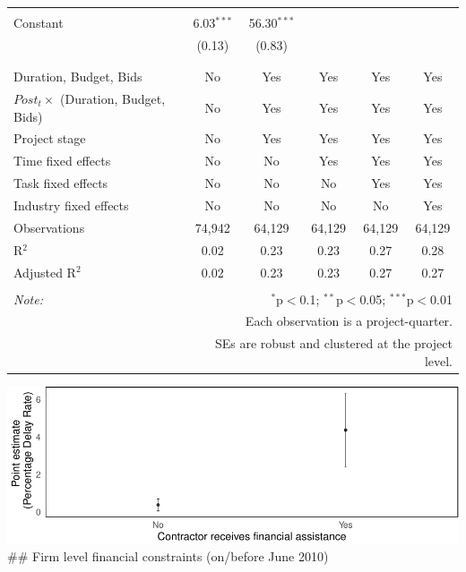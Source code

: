 \documentclass[
]{article}
\begin{document}
\begin{table}[H]
\begin{tabular}{@{\extracolsep{-2pt}}lccccc}
  & & & & & \\ 
 Constant & 6.03$^{***}$ & 56.30$^{***}$ &  &  &  \\ 
  & (0.13) & (0.83) &  &  &  \\ 
  & & & & & \\ 
\hline \\[-1.8ex] 
Duration, Budget, Bids & No & Yes & Yes & Yes & Yes \\ 
$Post_t \times $  (Duration, Budget, Bids) & No & Yes & Yes & Yes & Yes \\ 
Project stage & No & Yes & Yes & Yes & Yes \\ 
Time fixed effects & No & No & Yes & Yes & Yes \\ 
Task fixed effects & No & No & No & Yes & Yes \\ 
Industry fixed effects & No & No & No & No & Yes \\ 
Observations & 74,942 & 64,129 & 64,129 & 64,129 & 64,129 \\ 
R$^{2}$ & 0.02 & 0.23 & 0.23 & 0.27 & 0.28 \\ 
Adjusted R$^{2}$ & 0.02 & 0.23 & 0.23 & 0.27 & 0.27 \\ 
\hline 
\hline \\[-1.8ex] 
\textit{Note:}  & \multicolumn{5}{r}{$^{*}$p$<$0.1; $^{**}$p$<$0.05; $^{***}$p$<$0.01} \\ 
 & \multicolumn{5}{r}{Each observation is a project-quarter.} \\ 
 & \multicolumn{5}{r}{SEs are robust and clustered at the project level.} \\ 
\end{tabular} 
\end{table}

\includegraphics{qp_first_pc_delay-2_files/figure-latex/financial_assistance_plot-1.pdf}
\#\# Firm level financial constraints (on/before June 2010)
\end{document}
